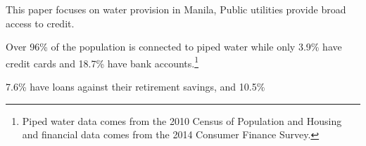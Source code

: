 \documentclass[12pt]{article}
\begin{document}












This paper focuses on water provision in Manila, Public utilities provide broad access to credit.  

Over 96\% of the population is connected to piped water while only 3.9\% have credit cards and 18.7\% have bank accounts.\footnote{Piped water data comes from the 2010 Census of Population and Housing and financial data comes from the 2014 Consumer Finance Survey.}  


 7.6\% have loans against their retirement savings, and 10.5\% 
\end{document}
